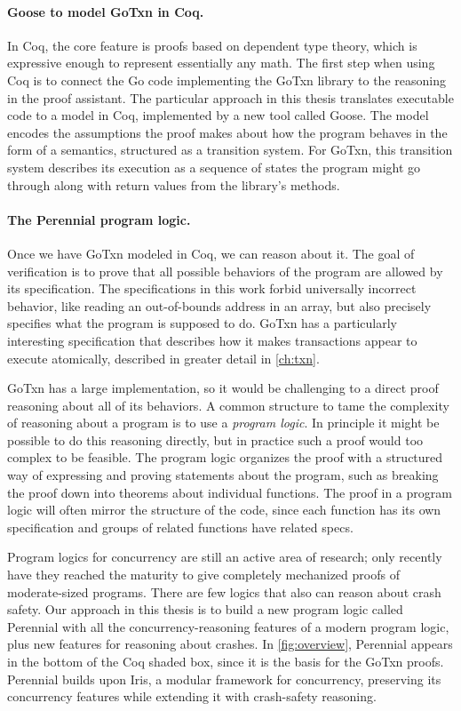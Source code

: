 \paragraph{Goose to model GoTxn in Coq.}
In Coq, the core feature is proofs based on dependent type theory, which is
expressive enough to represent essentially any math. The first step when using
Coq is to connect the Go code implementing the GoTxn library to the reasoning in
the proof assistant. The particular approach in this thesis translates
executable code to a model in Coq, implemented by a new tool called Goose. The model
encodes the assumptions the proof makes about how the program behaves in the
form of a semantics, structured as a transition system. For GoTxn, this
transition system describes its execution as a sequence of states the program
might go through along with return values from the library's methods.

\paragraph{The Perennial program logic.}
Once we have GoTxn modeled in Coq, we can reason about it. The goal of
verification is to prove that all possible behaviors of the program are allowed
by its specification. The specifications in this work forbid universally
incorrect behavior, like reading an out-of-bounds address in an array, but also
precisely specifies what the program is supposed to do. GoTxn has a particularly
interesting specification that describes how it makes transactions appear to
execute atomically, described in greater detail in \cref{ch:txn}.

GoTxn has a large implementation, so it would be challenging to a direct proof
reasoning about all of its behaviors.
A common structure to tame the complexity of reasoning about a program is to use
a \emph{program logic}. In principle it might be possible to do this reasoning
directly, but in practice such a proof would too
complex to be feasible. The program logic organizes the proof with a structured
way of expressing and proving statements about the program, such as breaking the
proof down into theorems about individual functions. The proof in a program
logic will often mirror the structure of the code, since each function has its
own specification and groups of related functions have related specs.

Program logics for concurrency are still an active area of research; only
recently have they reached the maturity to give completely mechanized proofs of
moderate-sized programs. There are few logics that also can reason about crash
safety. Our approach in this thesis is to build a new program logic called Perennial with all the
concurrency-reasoning features of a modern program logic, plus new features for
reasoning about crashes. In \cref{fig:overview}, Perennial appears in the bottom
of the Coq shaded box, since it is the basis for the GoTxn proofs. Perennial builds upon Iris, a modular framework for
concurrency, preserving its concurrency features while extending it with
crash-safety reasoning.

